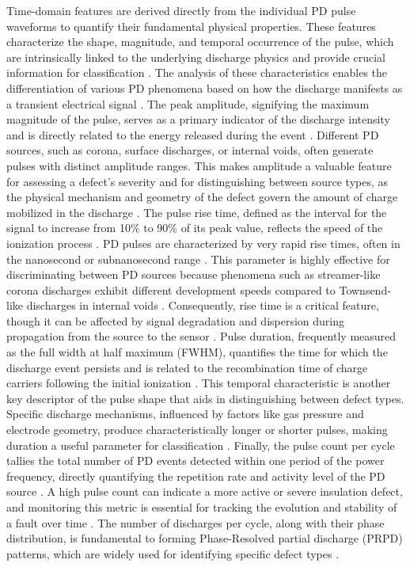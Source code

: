 Time-domain features are derived directly from the individual PD pulse waveforms to quantify their fundamental physical properties. These features characterize the shape, magnitude, and temporal occurrence of the pulse, which are intrinsically linked to the underlying discharge physics and provide crucial information for classification \parencite{Lu_2020_2}. The analysis of these characteristics enables the differentiation of various PD phenomena based on how the discharge manifests as a transient electrical signal \parencite{Boczar_2017}. The peak amplitude, signifying the maximum magnitude of the pulse, serves as a primary indicator of the discharge intensity and is directly related to the energy released during the event \parencite{Zhang_2024_28}. Different PD sources, such as corona, surface discharges, or internal voids, often generate pulses with distinct amplitude ranges. This makes amplitude a valuable feature for assessing a defect's severity and for distinguishing between source types, as the physical mechanism and geometry of the defect govern the amount of charge mobilized in the discharge \parencite{Boczar_2017}. The pulse rise time, defined as the interval for the signal to increase from 10\% to 90\% of its peak value, reflects the speed of the ionization process \parencite{Lu_2020_2}. PD pulses are characterized by very rapid rise times, often in the nanosecond or subnanosecond range \parencite{Darwish_2019}. This parameter is highly effective for discriminating between PD sources because phenomena such as streamer-like corona discharges exhibit different development speeds compared to Townsend-like discharges in internal voids \parencite{Xavier_2021}. Consequently, rise time is a critical feature, though it can be affected by signal degradation and dispersion during propagation from the source to the sensor \parencite{Lu_2020_2}. Pulse duration, frequently measured as the full width at half maximum (FWHM), quantifies the time for which the discharge event persists and is related to the recombination time of charge carriers following the initial ionization \parencite{MartinezTarifa_2022}. This temporal characteristic is another key descriptor of the pulse shape that aids in distinguishing between defect types. Specific discharge mechanisms, influenced by factors like gas pressure and electrode geometry, produce characteristically longer or shorter pulses, making duration a useful parameter for classification \parencite{Boczar_2017, Uwiringiyimana_2022}. Finally, the pulse count per cycle tallies the total number of PD events detected within one period of the power frequency, directly quantifying the repetition rate and activity level of the PD source \parencite{Gillis_2023}. A high pulse count can indicate a more active or severe insulation defect, and monitoring this metric is essential for tracking the evolution and stability of a fault over time \parencite{Ma_2021_3}. The number of discharges per cycle, along with their phase distribution, is fundamental to forming Phase-Resolved partial discharge (PRPD) patterns, which are widely used for identifying specific defect types \parencite{Boczar_2017, Kasinathan_2017}.

